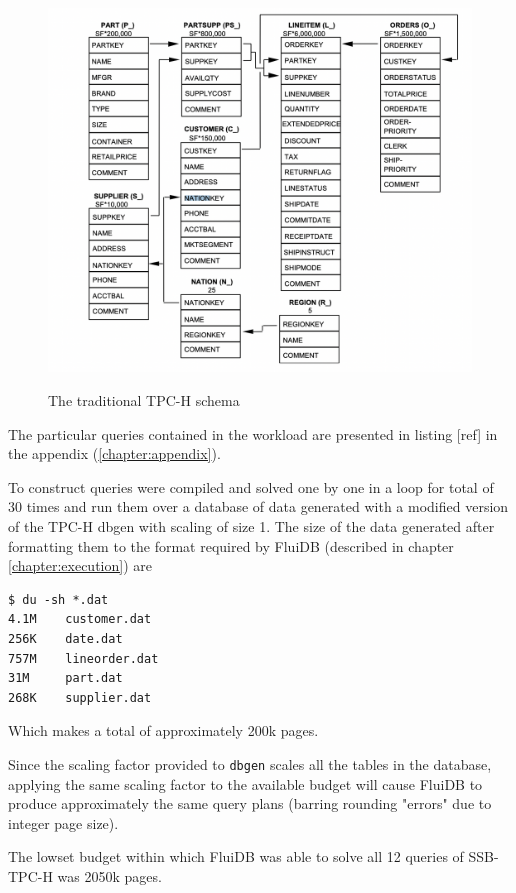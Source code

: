 \begin{figure}[p]
\centering
\includegraphics[width=.9\linewidth]{./imgs/2021-12-03_16-54-56_screenshot.png}
\label{fig:tpch_schema}
\caption{The traditional TPC-H schema}
\end{figure}


The particular queries contained in the workload are presented in
listing [ref] in the appendix (\ref{chapter:appendix}).

To construct queries were compiled and solved one by one in a loop for
total of 30 times and run them over a database of data generated with
a modified version of the TPC-H dbgen
\cite{perivolaropoulosFakedrakeSsbdbgen2021a} with scaling of size
1. The size of the data generated after formatting them to the format
required by FluiDB (described in chapter \ref{chapter:execution}) are

\begin{verbatim}
$ du -sh *.dat
4.1M    customer.dat
256K    date.dat
757M    lineorder.dat
31M     part.dat
268K    supplier.dat
\end{verbatim}

Which makes a total of approximately 200k pages.

Since the scaling factor provided to \texttt{dbgen} scales all the tables in
the database, applying the same scaling factor to the available budget
will cause FluiDB to produce approximately the same query plans
(barring rounding "errors" due to integer page size).

The lowset budget within which FluiDB was able to solve all 12 queries
of SSB-TPC-H was 2050k pages.

